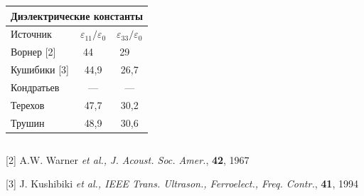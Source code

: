 \documentclass{beamer}
\begin{document}
{{\begin{columns}
\begin{table}
    \begin{tabular}{ l  c  c }
    \multicolumn{3}{c}{Диэлектрические константы} \\
      \hline 
      Источник & $\varepsilon_{11}/\varepsilon_{0}$ & $\varepsilon_{33}/\varepsilon_{0}$  \\
      \hline
      Ворнер [2] & 44~~ & 29~~  \\
      Кушибики [3] & 44,9 & 26,7   \\
      Кондратьев & --- & --- \\
      Терехов  & 47,7 & 30,2   \\
      Трушин & 48,9 & 30,6   \\
      \hline
    \end{tabular}
  \end{table}
\end{columns}

{\scriptsize 
    [2] A.W. Warner {\it{et al.}, J. Acoust. Soc. Amer.}, \textbf{42}, 1967
            
    \vspace*{-0.1cm}
    [3] J. Kushibiki {\it{et al.}, IEEE Trans. Ultrason., Ferroelect., Freq. Contr.}, \textbf{41}, 1994}
    \vspace*{\baselineskip}
}
}




\end{document}
